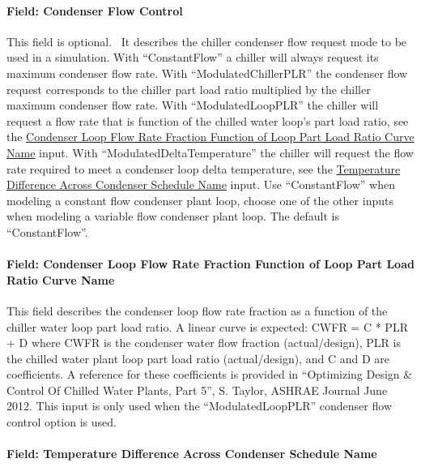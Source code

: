 \paragraph{Field: Condenser Flow Control}

This field is optional.~ It describes the chiller condenser flow request mode to be used in a simulation. With ``ConstantFlow'' a chiller will always request its maximum condenser flow rate. With ``ModulatedChillerPLR'' the condenser flow request corresponds to the chiller part load ratio multiplied by the chiller maximum condenser flow rate.  With  ``ModulatedLoopPLR'' the chiller will request a flow rate that is function of the chilled water loop's part load ratio, see the \hyperref[field-condenser-loop-flow-rate-function-of-loop-part-load-ratio-curve-name]{Condenser Loop Flow Rate Fraction Function of Loop Part Load Ratio Curve Name} input. With ``ModulatedDeltaTemperature'' the chiller will request the flow rate required to meet a condenser loop delta temperature, see the \hyperref[field-temperature-difference-across-condenser-schedule-name]{Temperature Difference Across Condenser Schedule Name} input. Use ``ConstantFlow'' when modeling a constant flow condenser plant loop, choose one of the other inputs when modeling a variable flow condenser plant loop. The default is ``ConstantFlow''.

\paragraph{Field: Condenser Loop Flow Rate Fraction Function of Loop Part Load Ratio Curve Name}\label{field-condenser-loop-flow-rate-function-of-loop-part-load-ratio-curve-name}

This field describes the condenser loop flow rate fraction as a function of the chiller water loop part load ratio. A linear curve is expected: CWFR = C * PLR + D where CWFR is the condenser water flow fraction (actual/design), PLR is the chilled water plant loop part load ratio (actual/design), and C and D are coefficients. A reference for these coefficients is provided in ``Optimizing Design \& Control Of Chilled Water Plants, Part 5'', S. Taylor, ASHRAE Journal June 2012.  This input is only used when the ``ModulatedLoopPLR'' condenser flow control option is used.

\paragraph{Field: Temperature Difference Across Condenser Schedule Name}\label{field-temperature-difference-across-condenser-schedule-name}

